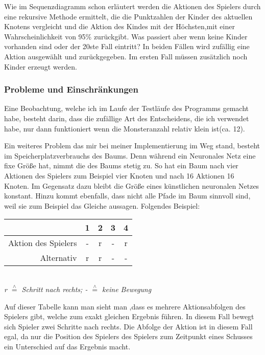 Wie im Sequenzdiagramm schon erläutert werden die Aktionen des Spielers durch eine rekursive Methode ermittelt, die die Punktzahlen der Kinder des aktuellen Knotens vergleicht und die Aktion des Kindes mit der Höchsten,mit einer Wahrscheinlichkeit von 95\% zurückgibt. Was passiert aber wenn keine Kinder vorhanden sind oder der 20ste Fall eintritt? In beiden Fällen wird zufällig eine Aktion ausgewählt und zurückgegeben. Im ersten Fall müssen zusätzlich noch Kinder erzeugt werden. 
\subsubsection{Probleme und Einschränkungen}
Eine Beobachtung, welche ich im Laufe der Testläufe des Programms gemacht habe, besteht darin, dass die zufällige Art des Entscheidens, die ich verwendet habe, nur dann funktioniert wenn die Monsteranzahl relativ klein ist(ca. 12).%

Ein weiteres Problem das mir bei meiner Implementierung im Weg stand, besteht im Speicherplatzverbrauchs des Baums. Denn während ein Neuronales Netz eine fixe Größe hat, nimmt die des Baums stetig zu. So hat ein Baum nach vier Aktionen des Spielers zum Beispiel vier Knoten und nach 16 Aktionen 16 Knoten. Im Gegensatz dazu bleibt die Größe eines künstlichen neuronalen Netzes konstant. Hinzu kommt ebenfalls, dass nicht alle  Pfade im Baum sinnvoll sind, weil sie zum Beispiel das Gleiche aussagen. Folgendes Beispiel:\\
\begin{center}


	\begin{tabular}[h]{r|c|c|c|c}
		 & 1 & 2 & 3 & 4\\
		\hline
		Aktion des Spielers & - & r & - & r\\
		\hline
		Alternativ & r & r & - & -\\

	\end{tabular}\\
	\textit{\small{ r $\stackrel{\wedge}{=}$ Schritt nach rechts; - $\stackrel{\wedge}{=}$ keine Bewegung}}
	\end{center}
	

Auf dieser Tabelle kann man sieht man ,dass es mehrere Aktionsabfolgen des Spielers gibt, welche zum exakt gleichen Ergebnis führen. In diesem Fall bewegt sich Spieler zwei Schritte nach rechts. Die Abfolge der Aktion ist in diesem Fall egal, da nur die Position des Spielers des Spielers zum Zeitpunkt eines Schusses ein Unterschied auf das Ergebnis macht.
